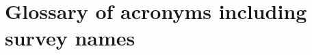 \documentclass[a4paper,11pt]{article}
\begin{document}










\newpage

\appendix

\section{Glossary of acronyms including survey names}
\end{document}
